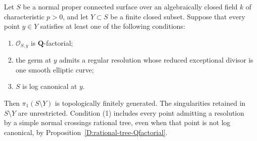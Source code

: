 \begin{theorem}
\label{D:surface-mixed-boundary}
Let $S$ be a normal proper connected surface over an algebraically
closed field $k$ of characteristic $p>0$, and let $Y\subset S$
be a finite closed subset.  Suppose that every point $y\in Y$
satisfies at least one of the following conditions:
\begin{enumerate}
\item $\mathcal O_{S,y}$ is $\mathbf Q$-factorial;
\item the germ at $y$ admits a regular resolution whose reduced
exceptional divisor is one smooth elliptic curve;
\item $S$ is log canonical at $y$.
\end{enumerate}
Then $\pi_1(S\setminus Y)$ is topologically finitely generated.
The singularities retained in $S\setminus Y$ are unrestricted.
Condition (1) includes every point admitting a resolution by a
simple normal crossings rational tree, even when that point is
not log canonical, by Proposition~\ref{D:rational-tree-Qfactorial}.
\end{theorem}
